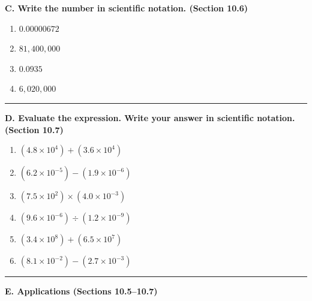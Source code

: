 \documentclass[11pt]{article}
\newcommand{\work}[1]{\vspace{#1}}
\begin{document}
\textbf{C. Write the number in scientific notation. (Section 10.6)}

\begin{enumerate}[resume]
\item $0.00000672$
\work{1.1in}

\item $81,\!400,\!000$
\work{1.1in}

\item $0.0935$
\work{1.1in}

\item $6,\!020,\!000$
\work{1.1in}
\end{enumerate}

\vspace{0.2em}
\hrule
\vspace{0.9em}

\textbf{D. Evaluate the expression. Write your answer in scientific notation. (Section 10.7)}

\begin{enumerate}[resume]
\item $(4.8\times10^{4}) + (3.6\times10^{4})$
\work{1.5in}

\item $(6.2\times10^{-5}) - (1.9\times10^{-6})$
\work{1.5in}

\item $(7.5\times10^{2}) \times (4.0\times10^{-3})$
\work{1.7in}

\item $(9.6\times10^{-6}) \div (1.2\times10^{-9})$
\work{1.7in}

\item $(3.4\times10^{8}) + (6.5\times10^{7})$
\work{1.7in}

\item $(8.1\times10^{-2}) - (2.7\times10^{-3})$
\work{1.7in}
\end{enumerate}

\vspace{0.2em}
\hrule
\vspace{0.9em}

\textbf{E. Applications (Sections 10.5--10.7)}
\end{document}
